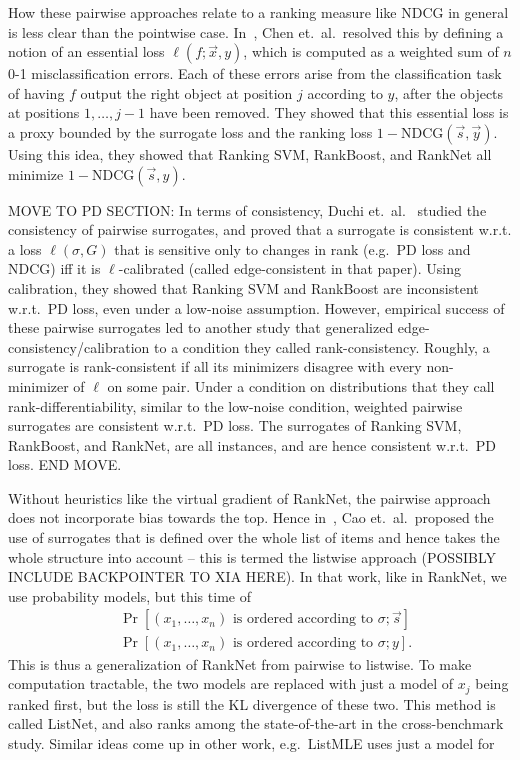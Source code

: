 How these pairwise approaches relate to a ranking measure like NDCG in general
is less clear than the pointwise case.
In~\cite{chen2009rankingmeasures}, Chen et.\ al.\ resolved this by defining
a notion of an essential loss $\ell(f; \vec{x}, y)$, which is computed as a
weighted sum of $n$ 0-1 misclassification errors. Each of these errors arise
from the classification task of having $f$ output the right object at position
$j$ according to $y$, after the objects at positions $1, \ldots, j-1$ have been
removed. They showed that this essential loss is a proxy bounded by
the surrogate loss and the ranking loss $1 - \text{NDCG}(\vec{s}, \vec{y})$.
Using this idea, they showed that Ranking SVM, RankBoost, and RankNet all
minimize $1 - \text{NDCG}(\vec{s}, y)$.

MOVE TO PD SECTION:
In terms of consistency, Duchi et.\ al.~\cite{duchi2010ranking}
studied the consistency of pairwise
surrogates, and proved that a surrogate is consistent w.r.t. a
loss $\ell(\sigma, G)$ that is sensitive only to changes in rank
(e.g.\ PD loss and NDCG) iff it is $\ell$-calibrated (called edge-consistent
in that paper). Using calibration, they showed that Ranking SVM and RankBoost
are inconsistent w.r.t.\ PD loss, even under a low-noise assumption.
However, empirical success of these pairwise surrogates led to another study
that generalized edge-consistency/calibration to a condition they called
rank-consistency.
Roughly, a surrogate is rank-consistent if all its minimizers
disagree with every non-minimizer of $\ell$ on some pair. Under a condition
on distributions that they call rank-differentiability,
similar to the low-noise condition, weighted pairwise surrogates are consistent
w.r.t.\ PD loss. The surrogates of Ranking SVM, RankBoost, and RankNet, are
all instances, and are hence consistent w.r.t.\ PD loss.
END MOVE.

Without heuristics like the virtual gradient of RankNet, the pairwise approach
does not incorporate bias towards the top. Hence
in~\cite{cao2007-pairwiselistwise}, Cao et.\ al.\ proposed the use of 
surrogates that is defined over the whole list of items and hence takes the
whole structure into account -- this is termed the listwise approach
(POSSIBLY INCLUDE BACKPOINTER TO XIA HERE).
In that work, like in RankNet, we use probability models, but this time of
\begin{align*}
  &\Pr[\text{$(x_1, \ldots, x_n)$ is ordered according to $\sigma$} ; \vec{s}] \\
  &\Pr[\text{$(x_1, \ldots, x_n)$ is ordered according to $\sigma$} ; y].
\end{align*}
This is thus a generalization of RankNet from pairwise to listwise. To make
computation tractable, the two models are replaced with just a model of
$x_j$ being ranked first, but the loss is still the KL divergence of these two.
This method is called ListNet, and also ranks among the state-of-the-art in the
cross-benchmark study. Similar ideas come up in other work, e.g.\ ListMLE
uses just a model for 


